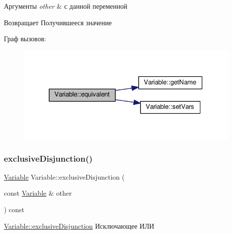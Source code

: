 \begin{DoxyParams}{Аргументы}
{\em other} & с данной переменной \\
\hline
\end{DoxyParams}
\begin{DoxyReturn}{Возвращает}
Получившееся значение 
\end{DoxyReturn}
Граф вызовов\+:\nopagebreak
\begin{figure}[H]
\begin{center}
\leavevmode
\includegraphics[width=316pt]{class_variable_a104b427ab0f43e9eb24f049ec6b524b0_cgraph}
\end{center}
\end{figure}
\mbox{\label{class_variable_a768fb534653ecc15e72f5d1201963705}} 
\subsubsection{\texorpdfstring{exclusive\+Disjunction()}{exclusiveDisjunction()}}
{\footnotesize\ttfamily \hyperlink{class_variable}{Variable} Variable\+::exclusive\+Disjunction (\begin{DoxyParamCaption}\item[{const \hyperlink{class_variable}{Variable} \&}]{other }\end{DoxyParamCaption}) const}



\hyperlink{class_variable_a768fb534653ecc15e72f5d1201963705}{Variable\+::exclusive\+Disjunction} Исключающее ИЛИ 


